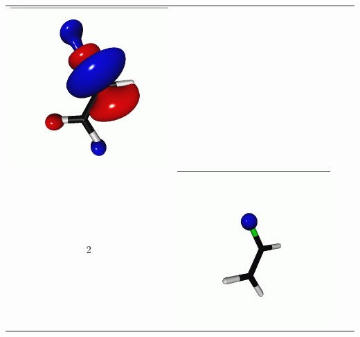 \documentclass[journal=jctcce,manuscript=article]{achemso}
\begin{document}
\begin{table}[H]
\begin{tabular}{ c | c c c }
\begin{minipage}{0.2\textwidth}
         \includegraphics[scale=0.10]{NTO/CH2CHF/CH2CHF_F_1p.png}
     \end{minipage}
     \\
         2 &  
     \begin{minipage}{0.2\textwidth}
         \centering
         \includegraphics[scale=0.10]{NTO/CH2CHF/CH2CHF_F_2h.png}

\end{minipage}
\end{tabular}
\end{table}
\end{document}
